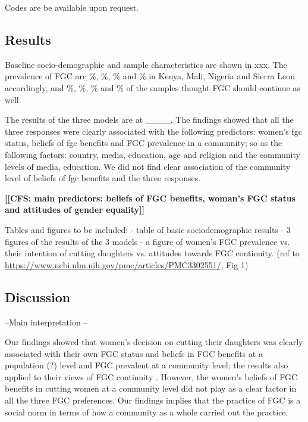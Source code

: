 \documentclass[12pt,]{article}
\newcommand{\comment}[1]{\textbf{[[#1]]}}
\newcommand{\cfcmt}[1]{\comment{CFS: #1}}
\begin{document}
Codes are be available upon request. 


\subsection{Results}\label{results-1}

Baseline socio-demographic and sample characteristics are shown in xxx.  The prevalence of FGC are \%, \%, \% and \% in Kenya, Mali, Nigeria and Sierra Leon accordingly, and \%, \%, \% and \%  of the samples thought FGC should continue as well.  

The results of the three models are at ____.  The findings showed that all the three responses were clearly associated with the following predictors:  women’s fgc status, beliefs of fgc benefits and FGC prevalence in a community; so as the following factors:  country, media, education, age and religion and the community levels of media, education.  We did not find clear association of the community level of beliefs of fgc benefits and the three responses.


\cfcmt{main predictors:  beliefs of FGC benefits, woman's FGC status and attitudes of gender equality}

Tables and figures to be included:
- table of basic sociodemographic results
- 3 figures of the results of the 3 models
- a figure of women’s FGC prevalence vs. their intention of cutting daughters vs. attitudes towards FGC continuity.  (ref to \url{https://www.ncbi.nlm.nih.gov/pmc/articles/PMC3302551/}, Fig 1)



\subsection{Discussion}\label{Discussion}

--Main interpretation --

Our findings showed that women’s decision on cutting their daughters was clearly associated with their own FGC status and beliefs in FGC benefits at a population (?) level and FGC prevalent at a community level; the results also applied to their views of FGC continuity .  However, the women’s beliefs of FGC benefits in cutting women at a community level did not play as a clear factor in all the three FGC preferences.  Our findings implies that the practice of FGC is a social norm in terms of how a community as a whole carried out the practice.
\end{document}
